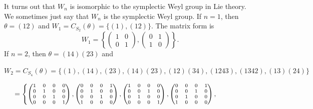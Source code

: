 \documentclass[11pt]{article}
\begin{document}
It turns out that $W_n$ is isomorphic to the symplectic Weyl group in Lie theory. We sometimes just say that $W_n$ is the symplectic Weyl group.  If $n=1$, then $\theta = (12)$ and 
$W_1 =C_{S_2}(\theta)=\{(1), (12)\}.$ The matrix form is
$$W_1=\left\{\begin{pmatrix}
                        1&0\\
                        0&1
                        \end{pmatrix},
                        \begin{pmatrix}
                        0&1\\
                        1&0
                        \end{pmatrix}
                        \right\}.
$$
If $n=2$, then $\theta = (14)(23)$ and 

$W_2 =C_{S_4}(\theta)=\{(1), (14), (23), (14)(23), (12)(34), (1243), (1342), (13)(24)\}
$

$\hspace{5mm} = 
\left\{\scriptsize  
              \begin{pmatrix}
                        1&0&0&0\\
                        0&1&0&0\\
                        0&0&1&0\\
                        0&0&0&1\\
                \end{pmatrix},
                \begin{pmatrix}
                        0&0&0&1\\
                        0&1&0&0\\
                        0&0&1&0\\
                        1&0&0&0\\
                \end{pmatrix},
                \begin{pmatrix}
                        1&0&0&0\\
                        0&0&1&0\\
                        0&1&0&0\\
                        0&0&0&1\\
                \end{pmatrix},
                \begin{pmatrix}
                        0&0&0&1\\
                        0&0&1&0\\
                        0&1&0&0\\
                        1&0&0&0\\
                \end{pmatrix},\right.$
              
\end{document}
